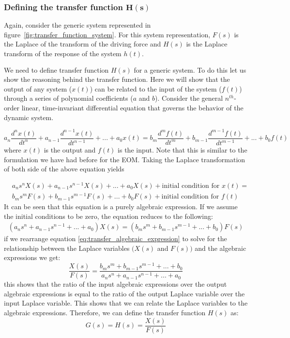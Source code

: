 \documentclass[12pt,letter]{article}
\numberwithin{ex}{section} %
\numberwithin{re}{section} %
\numberwithin{equation}{section}	%
\begin{document}
\subsubsection{Defining the transfer function $\mathbf{H(s)}$}

Again, consider the generic system represented in figure~\ref{fig:transfer_function_system}. For this system representation, $F(s)$ is the Laplace of the transform of the driving force and $H(s)$ is the Laplace transform of the response of the system $h(t)$. 

We need to define transfer function $H(s)$ for a generic system. To do this let us show the reasoning behind the transfer function. Here we will show that the output of any system ($x(t)$) can be related to the input of the system ($f(t)$) through a series of polynomial coefficients ($a$ and $b$). Consider the general $n^{th}$-order linear, time-invariant differential equation that governs the behavior of the dynamic system.

\begin{equation}
a_n\frac{d^nx(t)}{dt^n} + a_{n-1}\frac{d^{n-1}x(t)}{dt^{n-1}} + ... + a_0x(t) = b_m\frac{d^mf(t)}{dt^m} + b_{m-1}\frac{d^{m-1}f(t)}{dt^{m-1}} + ... + b_0f(t)
\end{equation} 
where $x(t)$ is the output and $f(t)$ is the input. Note that this is similar to the formulation we have had before for the EOM. Taking the Laplace transformation of both side of the above equation yields

\begin{eqnarray}
&a_ns^nX(s) + a_{n-1}s^{n-1}X(s) + ... + a_0X(s) + \text{initial condition for } x(t) =   \\
&b_ms^mF(s) + b_{m-1}s^{m-1}F(s) + ... + b_0F(s) + \text{initial condition for } f(t)  \nonumber
\label{eq:transfer_function_polynominal_expansion}
\end{eqnarray}
It can be seen that this equation is a purely algebraic expression. If we assume the initial conditions to be zero, the equation reduces to the following:
\begin{eqnarray}
(a_ns^n + a_{n-1}s^{n-1} + ... + a_0)X(s) =  (b_ms^m + b_{m-1}s^{m-1} + ... + b_0)F(s) 
\label{eq:transfer_algebraic_expression}
\end{eqnarray}
if we rearrange equation \ref{eq:transfer_algebraic_expression} to solve for the relationship between the Laplace variables $\big( X(s)$ and $F(s) \big)$ and the algebraic expressions we get:
\begin{equation}
\frac{X(s)}{F(s)} = \frac{b_ms^m + b_{m-1}s^{m-1} + ... + b_0}{a_ns^n + a_{n-1}s^{n-1} + ... + a_0}
\end{equation}
this shows that the ratio of the input algebraic expressions over the output algebraic expressions is equal to the ratio of the output Laplace variable over the input Laplace variable. This shows that we can relate the Laplace variables to the algebraic expressions. Therefore, we can define the transfer function $H(s)$ as: 
\begin{equation}
G(s) = H(s) = \frac{X(s)}{F(s)}
\label{eq:transfer_function}
\end{equation}
\end{document}
